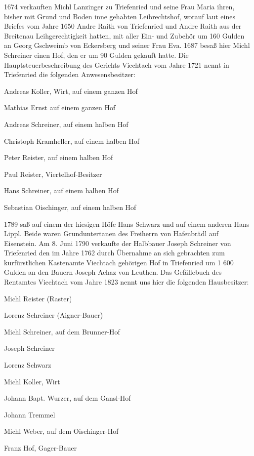 \documentclass{book}
\begin{document}
1674 verkauften Michl Lanzinger zu Triefenried und seine Frau Maria ihren,
bisher mit Grund und Boden inne gehabten Leibrechtshof, worauf laut eines
Briefes vom Jahre 1650 Andre Raith von Triefenried und Andre Raith aus der
Breitenau Leihgerechtigkeit hatten, mit aller Ein- und Zubehör um 160 Gulden an
Georg Gschweimb von Eckersberg und seiner Frau Eva. 1687 besaß hier Michl
Schreiner einen Hof, den er um 90 Gulden gekauft hatte. Die
Hauptsteuerbeschreibung des Gerichts Viechtach vom Jahre 1721 nennt in
Triefenried die folgenden Anwesensbesitzer:



Andreas Koller, Wirt, auf einem ganzen Hof

Mathias Ernst auf einem ganzen Hof

Andreas Schreiner, auf einem halben Hof

Christoph Kramheller, auf einem halben Hof

Peter Reister, auf einem halben Hof

Paul Reister, Viertelhof-Besitzer

Hans Schreiner, auf einem halben Hof

Sebastian Oischinger, auf einem halben Hof



1789 saß auf einem der hiesigen Höfe Hans Schwarz und auf einem anderen Hans
Lippl. Beide waren Grunduntertanen des Freiherrn von Hafenbrädl auf Eisenstein.
Am 8. Juni 1790 verkaufte der Halbbauer Joseph Schreiner von Triefenried den im
Jahre 1762 durch Übernahme an sich gebrachten zum kurfürstlichen Kastenamte
Viechtach gehörigen Hof in Triefenried um 1 600 Gulden an den Bauern Joseph
Achaz von Leuthen. Das Gefällebuch des Rentamtes Viechtach vom Jahre 1823 nennt
uns hier die folgenden Hausbesitzer:



Michl Reister (Raster)

Lorenz Schreiner (Aigner-Bauer)

Michl Schreiner, auf dem Brunner-Hof

Joseph Schreiner

Lorenz Schwarz

Michl Koller, Wirt

Johann Bapt. Wurzer, auf dem Gansl-Hof

Johann Tremmel

Michl Weber, auf dem Oischinger-Hof

Franz Hof, Gager-Bauer
\end{document}
